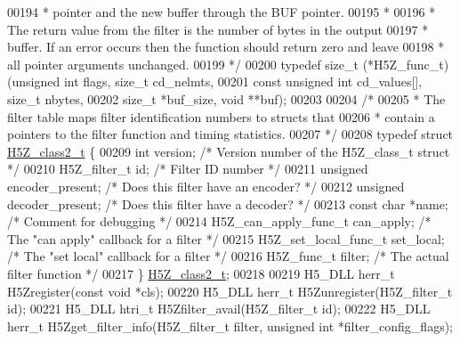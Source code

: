 \begin{DoxyCode}
00194 \textcolor{comment}{ * pointer and the new buffer through the BUF pointer.}
00195 \textcolor{comment}{ *}
00196 \textcolor{comment}{ * The return value from the filter is the number of bytes in the output}
00197 \textcolor{comment}{ * buffer. If an error occurs then the function should return zero and leave}
00198 \textcolor{comment}{ * all pointer arguments unchanged.}
00199 \textcolor{comment}{ */}
00200 \textcolor{keyword}{typedef} size\_t (*H5Z\_func\_t)(\textcolor{keywordtype}{unsigned} \textcolor{keywordtype}{int} flags, \textcolor{keywordtype}{size\_t} cd\_nelmts,
00201                  \textcolor{keyword}{const} \textcolor{keywordtype}{unsigned} \textcolor{keywordtype}{int} cd\_values[], \textcolor{keywordtype}{size\_t} nbytes,
00202                  \textcolor{keywordtype}{size\_t} *buf\_size, \textcolor{keywordtype}{void} **buf);
00203 
00204 \textcolor{comment}{/*}
00205 \textcolor{comment}{ * The filter table maps filter identification numbers to structs that}
00206 \textcolor{comment}{ * contain a pointers to the filter function and timing statistics.}
00207 \textcolor{comment}{ */}
00208 \textcolor{keyword}{typedef} \textcolor{keyword}{struct }\hyperlink{struct_h5_z__class2__t}{H5Z\_class2\_t} \{
00209     \textcolor{keywordtype}{int} version;                \textcolor{comment}{/* Version number of the H5Z\_class\_t struct */}
00210     H5Z\_filter\_t id;        \textcolor{comment}{/* Filter ID number              */}
00211     \textcolor{keywordtype}{unsigned} encoder\_present;   \textcolor{comment}{/* Does this filter have an encoder? */}
00212     \textcolor{keywordtype}{unsigned} decoder\_present;   \textcolor{comment}{/* Does this filter have a decoder? */}
00213     \textcolor{keyword}{const} \textcolor{keywordtype}{char}  *name;      \textcolor{comment}{/* Comment for debugging             */}
00214     H5Z\_can\_apply\_func\_t can\_apply; \textcolor{comment}{/* The "can apply" callback for a filter */}
00215     H5Z\_set\_local\_func\_t set\_local; \textcolor{comment}{/* The "set local" callback for a filter */}
00216     H5Z\_func\_t filter;      \textcolor{comment}{/* The actual filter function            */}
00217 \} \hyperlink{struct_h5_z__class2__t}{H5Z\_class2\_t};
00218 
00219 H5\_DLL herr\_t H5Zregister(\textcolor{keyword}{const} \textcolor{keywordtype}{void} *cls);
00220 H5\_DLL herr\_t H5Zunregister(H5Z\_filter\_t \textcolor{keywordtype}{id});
00221 H5\_DLL htri\_t H5Zfilter\_avail(H5Z\_filter\_t \textcolor{keywordtype}{id});
00222 H5\_DLL herr\_t H5Zget\_filter\_info(H5Z\_filter\_t filter, \textcolor{keywordtype}{unsigned} \textcolor{keywordtype}{int} *filter\_config\_flags);

\end{DoxyCode}
